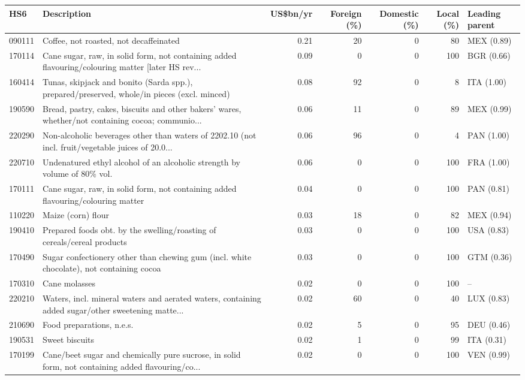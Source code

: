 \begin{tabular}{@{}l p{6.4cm} r r r r l@{}}
\toprule
HS6 & Description & US\$bn/yr & Foreign (\%) & Domestic (\%) & Local (\%) & Leading parent \\
\midrule
090111 & Coffee, not roasted, not decaffeinated & 0.21 & 20 & 0 & 80 & MEX (0.89) \\
170114 & Cane sugar, raw, in solid form, not containing added flavouring/\allowbreak{}colouring matter [later HS rev... & 0.09 & 0 & 0 & 100 & BGR (0.66) \\
160414 & Tunas, skipjack and bonito (Sarda spp.), prepared/\allowbreak{}preserved, whole/\allowbreak{}in pieces (excl. minced) & 0.08 & 92 & 0 & 8 & ITA (1.00) \\
190590 & Bread, pastry, cakes, biscuits and other bakers' wares, whether/\allowbreak{}not containing cocoa; communio... & 0.06 & 11 & 0 & 89 & MEX (0.99) \\
220290 & Non-alcoholic beverages other than waters of 2202.10 (not incl. fruit/\allowbreak{}vegetable juices of 20.0... & 0.06 & 96 & 0 & 4 & PAN (1.00) \\
220710 & Undenatured ethyl alcohol of an alcoholic strength by volume of 80\% vol. & 0.06 & 0 & 0 & 100 & FRA (1.00) \\
170111 & Cane sugar, raw, in solid form, not containing added flavouring/\allowbreak{}colouring matter & 0.04 & 0 & 0 & 100 & PAN (0.81) \\
110220 & Maize (corn) flour & 0.03 & 18 & 0 & 82 & MEX (0.94) \\
190410 & Prepared foods obt. by the swelling/\allowbreak{}roasting of cereals/\allowbreak{}cereal products & 0.03 & 0 & 0 & 100 & USA (0.83) \\
170490 & Sugar confectionery other than chewing gum (incl. white chocolate), not containing cocoa & 0.03 & 0 & 0 & 100 & GTM (0.36) \\
170310 & Cane molasses & 0.02 & 0 & 0 & 100 & -- \\
220210 & Waters, incl. mineral waters and aerated waters, containing added sugar/\allowbreak{}other sweetening matte... & 0.02 & 60 & 0 & 40 & LUX (0.83) \\
210690 & Food preparations, n.e.s. & 0.02 & 5 & 0 & 95 & DEU (0.46) \\
190531 & Sweet biscuits & 0.02 & 1 & 0 & 99 & ITA (0.31) \\
170199 & Cane/\allowbreak{}beet sugar and chemically pure sucrose, in solid form, not containing added flavouring/\allowbreak{}co... & 0.02 & 0 & 0 & 100 & VEN (0.99) \\
\bottomrule
\end{tabular}
